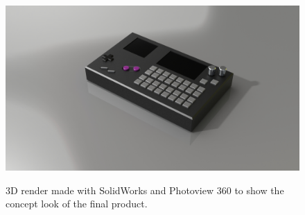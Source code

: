 \documentclass[]{article}
\begin{document}
\begin{appendices}
    \appendix
    \begin{landscape}
        \begin{figure}[h!]
        \textbf{}\\ %
        \includegraphics[width=1.1\linewidth]{volca-gb-render.JPG}
            \caption{3D render made with SolidWorks and Photoview 360 to show the concept look of the final product.}
        \end{figure}
    \end{landscape}
 \end{appendices}
\end{document}
